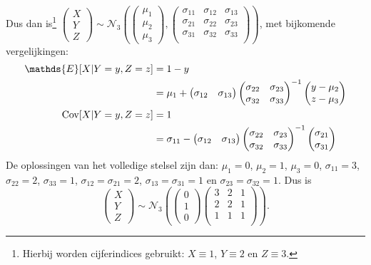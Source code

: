 \documentclass[a4paper,dutch,11pt,]{scrartcl}
\begin{document}
Dus dan is\footnote{Hierbij worden cijferindices gebruikt: $X\equiv 1$, $Y\equiv 2$ en $Z\equiv 3$.} $\begin{pmatrix} X \\ Y \\Z \end{pmatrix} \sim \mathcal{N}_3( \begin{pmatrix} \mu_1 \\ \mu_2 \\ \mu_3 \end{pmatrix}, 
\begin{pmatrix}
\sigma_{11}  & \sigma_{12} & \sigma_{13}\\
\sigma_{21} & \sigma_{22} & \sigma_{23} \\
\sigma_{31} & \sigma_{32} & \sigma_{33} \\
\end{pmatrix})$,  met bijkomende vergelijkingen:
\begin{align*}
\mathds{E}[{X|Y=y,Z=z}] &= 1-y \\ &= \mu_1 + \begin{pmatrix} \sigma_{12} & \sigma_{13} \end{pmatrix} 
\begin{pmatrix}
\sigma_{22} & \sigma_{23} \\
\sigma_{32} & \sigma_{33} 
\end{pmatrix}^{-1} \begin{pmatrix}y -\mu_2 \\ z-\mu_3 \end{pmatrix} \\
\textnormal{Cov}[X|Y=y,Z=z] &= 1 \\ &=\sigma_{11} - \begin{pmatrix} \sigma_{12} & \sigma_{13} \end{pmatrix} \begin{pmatrix} \sigma_{22} & \sigma_{23} \\ \sigma_{32} & \sigma_{33} \end{pmatrix}^{-1} \begin{pmatrix} \sigma_{21} \\ \sigma_{31}\end{pmatrix}
\end{align*}
De oplossingen van het volledige stelsel zijn dan: $\mu_1 = 0$, $\mu_2 = 1$, $\mu_3 = 0$, $\sigma_{11} = 3$, $\sigma_{22}=2$, $\sigma_{33}=1$, $\sigma_{12}=\sigma_{21}=2$, $\sigma_{13}=\sigma_{31}=1$ en $\sigma_{23}=\sigma_{32}=1$.
Dus is \[\begin{pmatrix} X \\ Y \\Z \end{pmatrix} \sim \mathcal{N}_3( \begin{pmatrix} 0 \\ 1 \\ 0 \end{pmatrix} 
\begin{pmatrix}
3  & 2 & 1\\
2 & 2 & 1 \\
1 & 1 & 1 \\
\end{pmatrix}).\]
\end{document}
